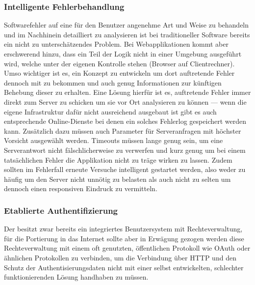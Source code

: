 \subsubsection{Intelligente Fehlerbehandlung}
Softwarefehler auf eine für den Benutzer angenehme Art und Weise zu behandeln und im Nachhinein detailliert zu analysieren ist bei traditioneller Software bereits ein nicht zu unterschätzendes Problem. Bei Webapplikationen kommt aber erschwerend hinzu, dass ein Teil der Logik nicht in einer Umgebung ausgeführt wird, welche unter der eigenen Kontrolle stehen (Browser auf Clientrechner). Umso wichtiger ist es, ein Konzept zu entwickeln um dort auftretende Fehler dennoch mit zu bekommen und auch genug Informationen zur künftigen Behebung dieser zu erhalten. Eine Lösung hierfür ist es, auftretende Fehler immer direkt zum Server zu schicken um sie vor Ort analysieren zu können --- wenn die eigene Infrastruktur dafür nicht ausreichend ausgebaut ist gibt es auch entsprechende Online-Dienste bei denen ein solches Fehlerlog gespeichert werden kann. Zusätzlich dazu müssen auch Parameter für Serveranfragen mit höchster Vorsicht ausgewählt werden. Timeouts müssen lange genug sein, um eine Serverantwort nicht fälschlicherweise zu verwerfen und kurz genug um bei einem tatsächlichen Fehler die Applikation nicht zu träge wirken zu lassen. Zudem sollten im Fehlerfall erneute Versuche intelligent gestartet werden, also weder zu häufig um den Server nicht unnötig zu belasten als auch nicht zu selten um dennoch einen responsiven Eindruck zu vermitteln.

\subsubsection{Etablierte Authentifizierung}
Der  besitzt zwar bereits ein integriertes Benutzersystem mit Rechteverwaltung, für die Portierung in das Internet sollte aber in Erwägung gezogen werden diese Rechteverwaltung mit einem oft genutzten, öffentlichen Protokoll wie OAuth oder ähnlichen Protokollen zu verbinden, um die Verbindung über HTTP und den Schutz der Authentisierungsdaten nicht mit einer selbst entwickelten, schlechter funktionierenden Lösung handhaben zu müssen.

